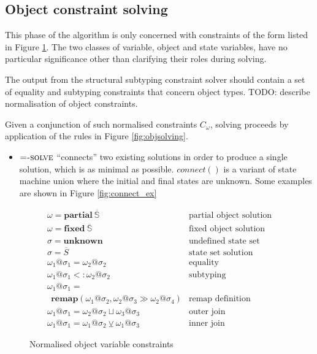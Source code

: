 \documentclass[preprint]{sigplanconf}
\makeatletter
\newcommand{\figref}[1]{Figure \ref{#1}}
\newcommand{\remapapp}[3]{\ensuremath{\mathbf{remap}(#1, #2 \gg #3)}}
\newcommand{\partialo}[2]{\mathbf{partial}\:\overline{\mathbb{S}_{#1}{#2}}}
\newcommand{\fixedo}[2]{\mathbf{fixed}\:\overline{\mathbb{S}_{#1}{#2}}}
\newcommand{\os}[2]{\omega_{#1}@\sigma_{#2}}
\makeatother
\begin{document}
\subsection{Object constraint solving}

This phase of the algorithm is only concerned with constraints of the form
listed in \figref{fig:objconstraints}. The two classes of variable, object
and state variables, have no particular significance other than clarifying
their roles during solving.

The output from the structural subtyping constraint solver should contain
a set of equality and subtyping constraints that concern object types.
TODO: describe normalisation of object constraints.

Given a conjunction of such normalised
constraints $C_\omega$, solving proceeds by application of the rules in
\figref{fig:objsolving}.

\begin{itemize}

\item $\textsc{=-solve}$ ``connects'' two existing solutions in order to
produce a single solution, which is as minimal as possible. $connect()$ is
a variant of state machine union where the initial and final states are
unknown. Some examples are shown in \figref{fig:connect_ex}

\end{itemize}

\begin{figure}
\[
\begin{array}{ll}
\omega = \partialo{}{} 
	& \text{partial object solution}
	\\
\omega = \fixedo{}{}
	& \text{fixed object solution} 
	\\
\sigma = \mathbf{unknown}
	& \text{undefined state set}
	\\
\sigma = \overline{S} 
	& \text{state set solution} 
	\\
\os{1}{1} = \os{2}{2} 
	& \text{equality} 
	\\
\os{1}{1} <: \os{2}{2} 
	& \text{subtyping} 
	\\
\os{1}{1} = \\
\:\:\remapapp{\os{1}{2}}{\os{2}{3}}{\os{2}{4}} 
	& \text{remap definition}
	\\
\os{1}{1} = \os{2}{2} \sqcup \os{3}{3}
	& \text{outer join}
	\\
\os{1}{1} = \os{1}{2} \veebar \os{1}{3}
	& \text{inner join}
\end{array}
\]
\caption{\label{fig:objconstraints} Normalised object variable constraints}
\end{figure}
\end{document}
